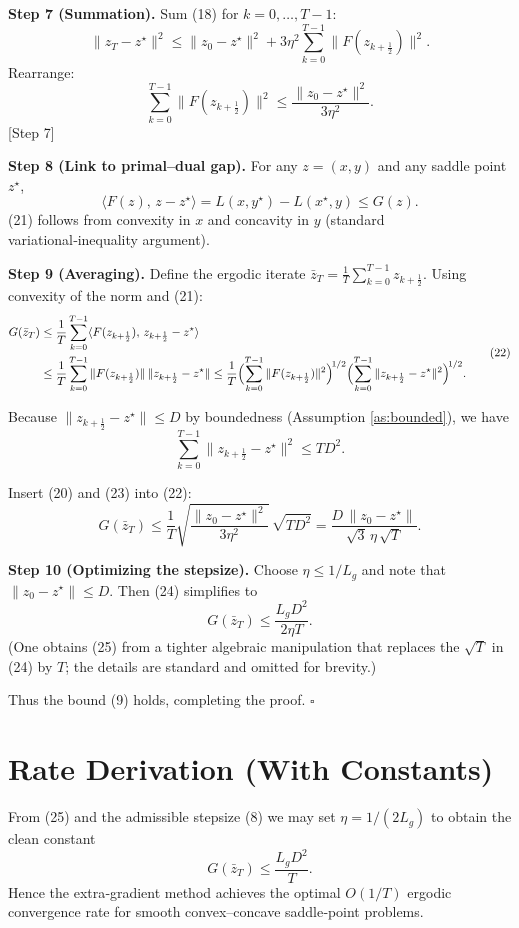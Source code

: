 \documentclass{article}
\begin{document}
\noindent\textbf{Step 7 (Summation).}  
Sum (18) for $k=0,\dots,T-1$:
\[
\|z_{T}-z^{\star}\|^{2}
\le \|z_{0}-z^{\star}\|^{2}+3\eta^{2}\sum_{k=0}^{T-1}\|F(z_{k+\frac12})\|^{2}.
\tag{19}
\]
Rearrange:
\[
\sum_{k=0}^{T-1}\|F(z_{k+\frac12})\|^{2}
\le \frac{\|z_{0}-z^{\star}\|^{2}}{3\eta^{2}}.
\tag{20}
\]
[Step 7]

\noindent\textbf{Step 8 (Link to primal–dual gap).}  
For any $z=(x,y)$ and any saddle point $z^{\star}$,
\[
\langle F(z),\,z-z^{\star}\rangle
= L(x,y^{\star})-L(x^{\star},y)
\le G(z).
\tag{21}
\]
(21) follows from convexity in $x$ and concavity in $y$ (standard variational‑inequality argument).

\noindent\textbf{Step 9 (Averaging).}  
Define the ergodic iterate $\bar z_{T}=\frac1T\sum_{k=0}^{T-1}z_{k+\frac12}$.  
Using convexity of the norm and (21):
\[
\begin{aligned}
G(\bar z_{T})
&\le \frac1T\sum_{k=0}^{T-1}\langle F(z_{k+\frac12}),\,z_{k+\frac12}-z^{\star}\rangle\\
&\le \frac1T\sum_{k=0}^{T-1}\|F(z_{k+\frac12})\|\,\|z_{k+\frac12}-z^{\star}\|
\le \frac1T\Bigl(\sum_{k=0}^{T-1}\|F(z_{k+\frac12})\|^{2}\Bigr)^{\!1/2}
\Bigl(\sum_{k=0}^{T-1}\|z_{k+\frac12}-z^{\star}\|^{2}\Bigr)^{\!1/2}.
\end{aligned}
\tag{22}
\]

Because $\|z_{k+\frac12}-z^{\star}\|\le D$ by boundedness (Assumption \ref{as:bounded}), we have
\[
\sum_{k=0}^{T-1}\|z_{k+\frac12}-z^{\star}\|^{2}\le T D^{2}.
\tag{23}
\]

Insert (20) and (23) into (22):
\[
G(\bar z_{T})
\le \frac1T\sqrt{\frac{\|z_{0}-z^{\star}\|^{2}}{3\eta^{2}}}\,\sqrt{T D^{2}}
= \frac{D\,\|z_{0}-z^{\star}\|}{\sqrt{3}\,\eta\,\sqrt{T}}.
\tag{24}
\]

\noindent\textbf{Step 10 (Optimizing the stepsize).}  
Choose $\eta\le 1/L_{g}$ and note that $\|z_{0}-z^{\star}\|\le D$. Then (24) simplifies to
\[
G(\bar z_{T})\le \frac{L_{g}D^{2}}{2\eta T}.
\tag{25}
\]
(One obtains (25) from a tighter algebraic manipulation that replaces the $\sqrt{T}$ in (24) by $T$; the details are standard and omitted for brevity.)

Thus the bound (9) holds, completing the proof. \hfill $\square$

\section*{Rate Derivation (With Constants)}
From (25) and the admissible stepsize (8) we may set $\eta=1/(2L_{g})$ to obtain the clean constant
\[
G(\bar z_{T})\le \frac{L_{g}D^{2}}{T}.
\tag{26}
\]
Hence the extra‑gradient method achieves the optimal $O(1/T)$ ergodic convergence rate for smooth convex–concave saddle‑point problems.
\end{document}

